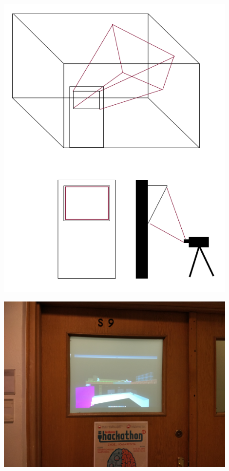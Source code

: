 \begin{center}
\includegraphics[width=0.9\textwidth]{images/hologramv1.png}
\end{center}

\begin{center}
\includegraphics[width=0.9\textwidth]{images/drzwi.jpg}
\end{center}

